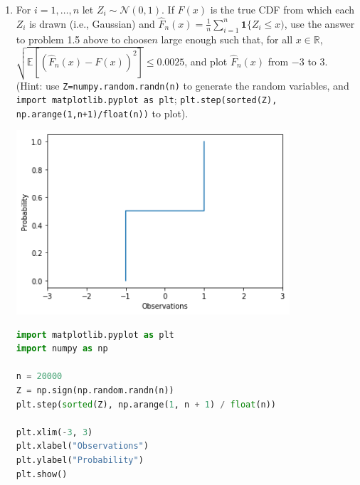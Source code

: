 \documentclass{article}
\newcommand{\field}[1]{\mathbb{#1}}
\newcommand{\1}{\mathbf{1}}
\newcommand{\E}{\mathbb{E}}
\newcommand{\R}{\field{R}} %
\begin{document}
\begin{enumerate}
\item For $i=1,\dots,n$ let $Z_i \sim \mathcal{N}(0,1)$. If $F(x)$ is the true CDF from which each $Z_i$ is drawn (i.e., Gaussian) and $\widehat{F}_n(x) = \frac{1}{n} \sum_{i=1}^n \1\{ Z_i \leq x)$, use the answer to problem 1.5 above to choose$n$ large enough such that, for all $x \in \R$, $ \sqrt{\E[(\widehat{F}_n(x)-F(x))^2 ]} \leq 0.0025$, and plot $\widehat{F}_n(x)$ from $-3$ to $3$. \\(Hint: use \texttt{Z=numpy.random.randn(n)} to generate the random variables, and \texttt{import matplotlib.pyplot as plt}; \texttt{plt.step(sorted(Z), np.arange(1,n+1)/float(n))} to plot). 
    \begin{center}
    \includegraphics[width=4in]{HW0_plots/cumdist1.png}
    \end{center} 
    	\begin{lstlisting}[language=Python]
import matplotlib.pyplot as plt
import numpy as np

n = 20000
Z = np.sign(np.random.randn(n))
plt.step(sorted(Z), np.arange(1, n + 1) / float(n))

plt.xlim(-3, 3)
plt.xlabel("Observations")
plt.ylabel("Probability")
plt.show()
    \end{lstlisting}
    

\end{enumerate}
\end{document}
